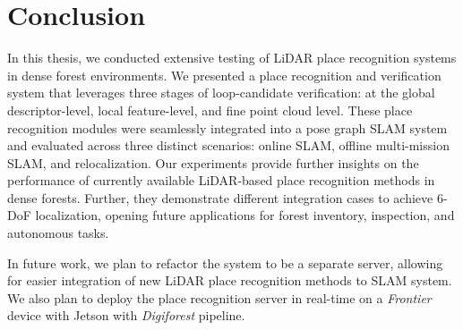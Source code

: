 \chapter{Conclusion}
\label{chap:conclusion}

In this thesis, we conducted extensive testing of LiDAR place recognition systems in dense forest environments. We presented a place recognition and verification system that leverages three stages of loop-candidate verification: at the global descriptor-level, local feature-level, and fine point cloud level. These place recognition modules were seamlessly integrated into a pose graph SLAM system and evaluated across three distinct scenarios: online SLAM, offline multi-mission SLAM, and relocalization. Our experiments provide further insights on the performance of currently available LiDAR-based place recognition methods in dense forests. Further, they demonstrate different integration cases to achieve 6-DoF localization, opening future applications for forest inventory, inspection, and autonomous tasks. 

In future work, we plan to refactor the system to be a separate server, allowing for easier integration of new LiDAR place recognition methods to SLAM system. We also plan to deploy the place recognition server in real-time on a \emph{Frontier} device with Jetson with \emph{Digiforest} pipeline. 